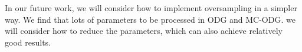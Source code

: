 \documentclass[runningheads]{llncs}
\begin{document}
In our future work, we will consider how to implement oversampling in a simpler way.
We find that lots of parameters to be processed in ODG and MC-ODG. 
we will consider how to reduce the parameters, which can also achieve relatively good results.


  
  
  
  
  
  
  
  
  
  
\end{document}
